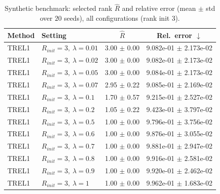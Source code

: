 \begin{table}[t]
\centering
\caption{Synthetic benchmark: selected rank \(\hat R\) and relative error (mean \(\pm\) std over \(20\) seeds), all configurations (rank init 3).}
\label{tab:results_synth_all}
\begin{tabular}{@{}llcc@{}}
\toprule
Method & Setting & \(\hat R\) & Rel.\ error \(\downarrow\) \\ \midrule
TREL1 & \(R_{init}=3,\ \lambda=0.01\) & 3.00 $\pm$ 0.00 & 9.082e-01 $\pm$ 2.173e-02 \\
TREL1 & \(R_{init}=3,\ \lambda=0.02\) & 3.00 $\pm$ 0.00 & 9.082e-01 $\pm$ 2.173e-02 \\
TREL1 & \(R_{init}=3,\ \lambda=0.05\) & 3.00 $\pm$ 0.00 & 9.084e-01 $\pm$ 2.173e-02 \\
TREL1 & \(R_{init}=3,\ \lambda=0.07\) & 2.95 $\pm$ 0.22 & 9.085e-01 $\pm$ 2.169e-02 \\
TREL1 & \(R_{init}=3,\ \lambda=0.1\) & 1.70 $\pm$ 0.57 & 9.215e-01 $\pm$ 2.527e-02 \\
TREL1 & \(R_{init}=3,\ \lambda=0.2\) & 1.05 $\pm$ 0.22 & 9.423e-01 $\pm$ 3.797e-02 \\
TREL1 & \(R_{init}=3,\ \lambda=0.5\) & 1.00 $\pm$ 0.00 & 9.796e-01 $\pm$ 3.756e-02 \\
TREL1 & \(R_{init}=3,\ \lambda=0.6\) & 1.00 $\pm$ 0.00 & 9.876e-01 $\pm$ 3.055e-02 \\
TREL1 & \(R_{init}=3,\ \lambda=0.7\) & 1.00 $\pm$ 0.00 & 9.881e-01 $\pm$ 2.947e-02 \\
TREL1 & \(R_{init}=3,\ \lambda=0.8\) & 1.00 $\pm$ 0.00 & 9.916e-01 $\pm$ 2.581e-02 \\
TREL1 & \(R_{init}=3,\ \lambda=0.9\) & 1.00 $\pm$ 0.00 & 9.920e-01 $\pm$ 2.462e-02 \\
TREL1 & \(R_{init}=3,\ \lambda=1\) & 1.00 $\pm$ 0.00 & 9.962e-01 $\pm$ 1.683e-02 \\
\bottomrule
\end{tabular}
\end{table}